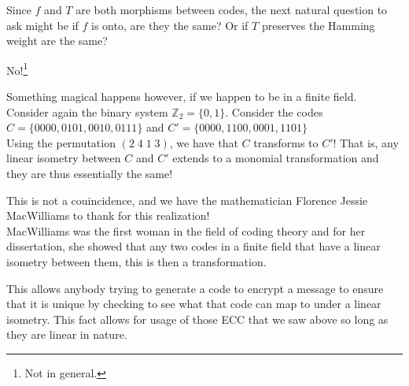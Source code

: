 \documentclass{beamer}
\begin{document}
\begin{frame}
    
    Since $f$ and $T$ are both morphisms between codes, the next natural question to ask might be if $f$
    is onto, are they the same? Or if $T$ preserves the Hamming weight are the same?

\end{frame}

\begin{frame}
    
    \begin{center}
        No!\footnote{Not in general.}
    \end{center}

\end{frame}

\begin{frame}
    
    Something magical happens however, if we happen to be in a finite field.\\
    Consider again the binary system $\mathbb{Z}_2=\{0,1\}$. Consider the codes
    $C=\{0000,0101,0010,0111\}$ and $C'=\{0000,1100,0001,1101\}$\\
    Using the permutation $(2\;4\;1\;3)$, we have that $C$ transforms to $C'$! That is, any linear
    isometry between $C$ and $C'$ extends to a monomial transformation and they are thus essentially the
    same!

\end{frame}

\begin{frame}
    
    This is not a couincidence, and we have the mathematician Florence Jessie MacWilliams to thank for
    this realization!\\
    MacWilliams was the first woman in the field of coding theory and for her dissertation, she showed
    that any two codes in a finite field that have a linear isometry between them, this is then a
    transformation.

\end{frame}

\begin{frame}
    
    This allows anybody trying to generate a code to encrypt a message to ensure that it is unique by
    checking to see what that code can map to under a linear isometry. This fact allows for usage of
    those ECC that we saw above so long as they are linear in nature.

\end{frame}
\end{document}
